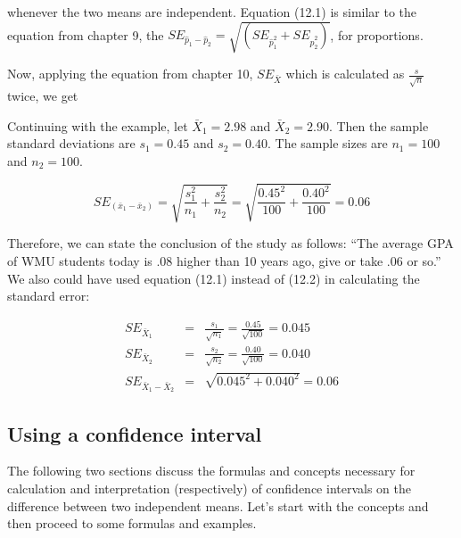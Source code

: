 \documentclass[11pt]{book}\usepackage[]{graphicx}\usepackage[]{color}
\begin{document}
whenever the two means are independent.  Equation (12.1) is similar to the equation from chapter 9, the $SE_{\hat{p}_1 - \hat{p}_2} = \sqrt{(SE_{\hat{p}_1^2} + SE_{\hat{p}_2^2 })}$, for proportions. 

Now, applying the equation from chapter 10, $SE_{\bar{X}}$ which is calculated as $\frac{s}{\sqrt{n}}$ twice, we get


Continuing with the example, let $\bar{X}_1  = 2.98$ and $\bar{X}_2  = 2.90$.  Then the sample standard deviations are $s_1 = 0.45$ and $s_2 = 0.40$.   The sample sizes are $n_1 = 100$ and $n_2 = 100$.

\begin{equation*}
SE_{(\bar{x}_1 - \bar{x}_2)} = \sqrt{\frac{s_1^2}{n_1}  + \frac{s_2^2}{n_2} } = \sqrt{\frac{0.45^2}{100}  + \frac{0.40^2}{100} } = 0.06
\end{equation*}

Therefore, we can state the conclusion of the study as follows: ``The average GPA of WMU students today is .08 higher than 10 years ago, give or take .06 or so.'' We also could have used equation (12.1) instead of (12.2) in calculating the standard error:

\begin{eqnarray*}
SE_{\bar{X}_1} &=& \frac{s_1}{\sqrt{n_1}} = \frac{0.45}{\sqrt{100}} = 0.045 \\
SE_{\bar{X}_2} &=& \frac{s_2}{\sqrt{n_2}} = \frac{0.40}{\sqrt{100}} = 0.040 \\
SE_{\bar{X}_1 - \bar{X}_2} &=& \sqrt{0.045^2 + 0.040^2} = 0.06 
\end{eqnarray*}

\subsection{Using a confidence interval}

The following two sections discuss the formulas and concepts necessary for calculation and interpretation (respectively) of confidence intervals on the difference between two independent means. Let’s start with the concepts and then proceed to some formulas and examples.
\end{document}
